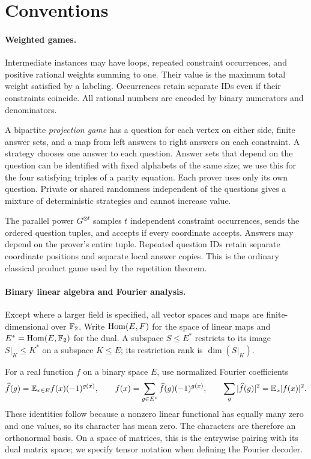 \section{Conventions}\label{sec:preliminaries}

\paragraph{Weighted games.}
Intermediate instances may have loops, repeated constraint occurrences,
and positive rational weights summing to one. Their value is the maximum
total weight satisfied by a labeling. Occurrences retain separate IDs
even if their constraints coincide. All rational numbers are encoded by
binary numerators and denominators.

A bipartite \emph{projection game} has a question for each vertex on
either side, finite answer sets, and a map from left answers to right
answers on each constraint. A strategy chooses one answer to each
question. Answer sets that depend on the question can be identified
with fixed alphabets of the same size; we use this for the four
satisfying triples of a parity equation. Each prover uses only its own
question. Private or shared randomness independent of the questions
gives a mixture of deterministic strategies and cannot increase value.

The parallel power \(G^{\otimes t}\) samples \(t\) independent
constraint occurrences, sends the ordered question tuples, and accepts
if every coordinate accepts. Answers may depend on the prover's entire
tuple. Repeated question IDs retain separate coordinate positions and
separate local answer copies. This is the ordinary classical product
game used by the repetition theorem.

\paragraph{Binary linear algebra and Fourier analysis.}
Except where a larger field is specified, all vector spaces and maps
are finite-dimensional over \(\mathbb F_2\). Write \(\operatorname{Hom}(E,F)\) for the
space of linear maps and \(E^*=\operatorname{Hom}(E,\mathbb F_2)\) for the dual. A subspace
\(S\le E^*\) restricts to its image \(S|_K\le K^*\) on a subspace
\(K\le E\); its restriction rank is \(\dim(S|_K)\).

For a real function \(f\) on a binary space \(E\), use normalized
Fourier coefficients
\[
 \widehat f(g)=\mathbb E_{x\in E}f(x)(-1)^{g(x)},\qquad
 f(x)=\sum_{g\in E^*}\widehat f(g)(-1)^{g(x)},\qquad
 \sum_g|\widehat f(g)|^2=\mathbb E_x|f(x)|^2.
\]
These identities follow because a nonzero linear functional has equally
many zero and one values, so its character has mean zero. The characters
are therefore an orthonormal basis. On a space of matrices, this is
the entrywise pairing with its dual matrix space; we specify tensor
notation when defining the Fourier decoder.

